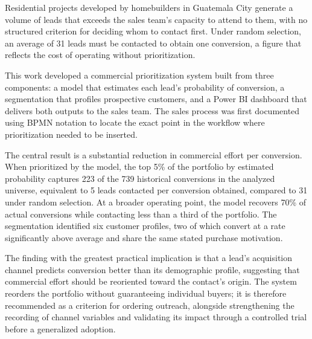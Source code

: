 
Residential projects developed by homebuilders in Guatemala City generate a volume of leads that exceeds the sales team's capacity to attend to them, with no structured criterion for deciding whom to contact first. Under random selection, an average of 31 leads must be contacted to obtain one conversion, a figure that reflects the cost of operating without prioritization.

This work developed a commercial prioritization system built from three components: a model that estimates each lead's probability of conversion, a segmentation that profiles prospective customers, and a Power BI dashboard that delivers both outputs to the sales team. The sales process was first documented using BPMN notation to locate the exact point in the workflow where prioritization needed to be inserted.

The central result is a substantial reduction in commercial effort per conversion. When prioritized by the model, the top 5\% of the portfolio by estimated probability captures 223 of the 739 historical conversions in the analyzed universe, equivalent to 5 leads contacted per conversion obtained, compared to 31 under random selection. At a broader operating point, the model recovers 70\% of actual conversions while contacting less than a third of the portfolio. The segmentation identified six customer profiles, two of which convert at a rate significantly above average and share the same stated purchase motivation.

The finding with the greatest practical implication is that a lead's acquisition channel predicts conversion better than its demographic profile, suggesting that commercial effort should be reoriented toward the contact's origin. The system reorders the portfolio without guaranteeing individual buyers; it is therefore recommended as a criterion for ordering outreach, alongside strengthening the recording of channel variables and validating its impact through a controlled trial before a generalized adoption.
